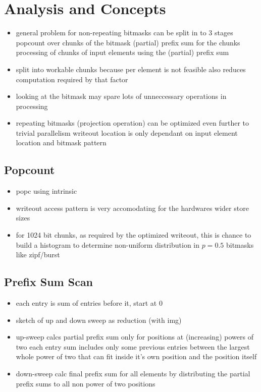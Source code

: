 \documentclass{tudscrartcl}
\begin{document}
	\section{Analysis and Concepts}
		\begin{itemize}
			\item general problem for non-repeating bitmasks can be split in to 3 stages
				\subitem popcount over chunks of the bitmask
				\subitem (partial) prefix sum for the chunks
				\subitem processing of chunks of input elements using the (partial) prefix sum
			\item split into workable chunks because per element is not feasible
				\subitem also reduces computation required by that factor
			\item looking at the bitmask may spare lots of unneccessary operations in processing
			\item repeating bitmasks (projection operation) can be optimized even further to trivial parallelism
				\subitem writeout location is only dependant on input element location and bitmask pattern
		\end{itemize}
	
		\subsection{Popcount}
			\begin{itemize}
				\item popc using intrinsic
				\item writeout access pattern is very accomodating for the hardwares wider store sizes
				\item for 1024 bit chunks, as required by the optimized writeout, this is chance to build a histogram to determine non-uniform distribution in $p=0.5$ bitmasks like zipf/burst
			\end{itemize}
		
		\subsection{Prefix Sum Scan}
			\begin{itemize}
				\item each entry is sum of entries before it, start at 0
				\item sketch of up and down sweep as reduction (with img)
				\item up-sweep calcs partial prefix sum
					\subitem only for positions at (increasing) powers of two
					\subitem each entry sum includes only some previous entries
						\subsubitem between the largest whole power of two that can fit inside it's own position
						\subsubitem and the position itself
				\item down-sweep calc final prefix sum for all elements
					\subitem by distributing the partial prefix sums to all non power of two positions
			\end{itemize}
		
\end{document}
